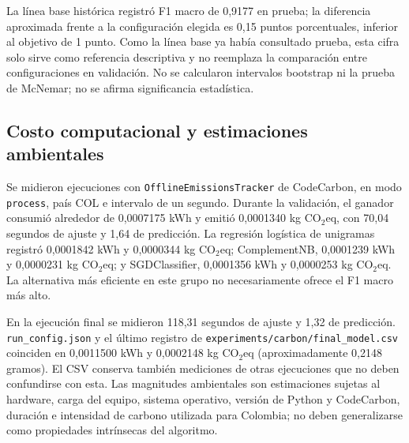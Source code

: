 \documentclass[conference]{IEEEtran}
\begin{document}
La línea base histórica registró F1 macro de 0,9177 en prueba;
la diferencia aproximada frente a la configuración elegida es
0,15 puntos porcentuales, inferior al objetivo de 1 punto.
Como la línea base ya había consultado prueba, esta cifra solo
sirve como referencia descriptiva y no reemplaza la comparación
entre configuraciones en validación. No se calcularon intervalos
bootstrap ni la prueba de McNemar; no se afirma significancia
estadística.

\subsection{Costo computacional y estimaciones ambientales}
Se midieron ejecuciones con \texttt{OfflineEmissionsTracker} de
CodeCarbon, en modo \texttt{process}, país COL e intervalo de un
segundo. Durante la validación, el ganador consumió alrededor de
0,0007175 kWh y emitió 0,0001340 kg CO\(_2\)eq, con 70,04 segundos
de ajuste y 1,64 de predicción. La regresión logística de unigramas
registró 0,0001842 kWh y 0,0000344 kg CO\(_2\)eq;
ComplementNB, 0,0001239 kWh y 0,0000231 kg CO\(_2\)eq; y
SGDClassifier, 0,0001356 kWh y 0,0000253 kg CO\(_2\)eq.
La alternativa más eficiente en este grupo no necesariamente
ofrece el F1 macro más alto.

En la ejecución final se midieron 118,31 segundos de ajuste y
1,32 de predicción. \texttt{run\_config.json} y el último registro
de \texttt{experiments/carbon/final\_model.csv} coinciden en
0,0011500 kWh y 0,0002148 kg CO\(_2\)eq (aproximadamente
0,2148 gramos). El CSV conserva también mediciones de otras
ejecuciones que no deben confundirse con esta. Las magnitudes
ambientales son estimaciones sujetas al hardware, carga del equipo,
sistema operativo, versión de Python y CodeCarbon, duración e
intensidad de carbono utilizada para Colombia; no deben
generalizarse como propiedades intrínsecas del algoritmo.
\end{document}
